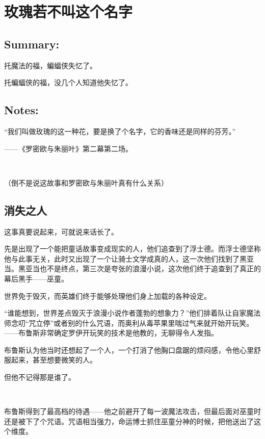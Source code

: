 \documentclass[../main.tex]{subfiles}
\begin{document}
\pagestyle{mystyle}

\chapter{玫瑰若不叫这个名字}
\vspace{3cm}


\section*{Summary:}

托魔法的福，蝙蝠侠失忆了。

托蝙蝠侠的福，没几个人知道他失忆了。

\section*{Notes:}

“我们叫做玫瑰的这一种花，要是换了个名字，它的香味还是同样的芬芳。”

\hfill——《罗密欧与朱丽叶》第二幕第二场。

~\

（倒不是说这故事和罗密欧与朱丽叶真有什么关系）

\newpage

\setcounter{section}{-1}

\section{消失之人}

这事真要说起来，可就说来话长了。

先是出现了一个能把童话故事变成现实的人，他们追查到了浮士德。而浮士德坚称他与此事无关，此时又出现了一个让骑士文学成真的人，这一次他们找到了黑亚当。黑亚当也不是终点，第三次是夸张的浪漫小说，这次他们终于追查到了真正的幕后黑手——巫童。

世界免于毁灭，而英雄们终于能够处理他们身上加载的各种设定。

“谁能想到，世界差点毁灭于浪漫小说作者蓬勃的想象力？”他们排着队让自家魔法师念叨“咒立停”或者别的什么咒语，而奥利从毒苹果里喘过气来就开始开玩笑。——布鲁斯非常确定罗伊开玩笑的技术是他教的，无聊得令人发指。

布鲁斯认为他当时还想起了一个人，一个打消了他胸口盘踞的烦闷感，令他心里舒服起来，甚至想要微笑的人。

但他不记得那是谁了。

~\

布鲁斯得到了最高档的待遇——他之前避开了每一波魔法攻击，但最后面对巫童时还是被下了个咒语。咒语相当强力，命运博士抓住巫童分神的时候，把他送出了这个维度。
\end{document}
